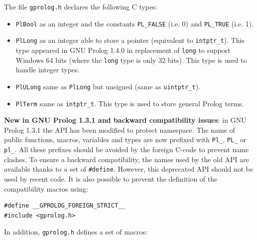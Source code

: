 
The file \texttt{gprolog.h} declares the following C types:

\begin{itemize}

\item \texttt{PlBool} as an integer and the constants \texttt{PL\_FALSE} (i.e. 0) and \texttt{PL\_TRUE}
(i.e. 1).

\item \texttt{PlLong} as an integer able to store a pointer (equivalent to
  \texttt{intptr\_t}). This type appeared in GNU Prolog 1.4.0 in replacement
  of \texttt{long} to support Windows 64 bits (where the \texttt{long} type is only
  32 bits). This type is used to handle integer types.

\item \texttt{PlULong} same as \texttt{PlLong} but unsigned (same as \texttt{uintptr\_t}).

\item \texttt{PlTerm} same as \texttt{intptr\_t}. This type is used to store general Prolog terms.

\end{itemize}


\textbf{New in GNU Prolog 1.3.1 and backward compatibility issues}: in
GNU Prolog 1.3.1 the API has been modified to protect namespace. The name of
public functions, macros, variables and types are now prefixed
with \texttt{Pl\_}, \texttt{PL\_} or \texttt{pl\_}. All these prefixes should
be avoided by the foreign C-code to prevent name clashes. To ensure a
backward compatibility, the names used by the old API are available thanks to
a set of \texttt{\#define}. However, this deprecated API should not be used
by recent code. It is also possible to prevent the definition of the
compatibility macros using:

\begin{Code}
\begin{verbatim}
#define __GPROLOG_FOREIGN_STRICT__
#include <gprolog.h>
\end{verbatim}
\end{Code}

In addition, \texttt{gprolog.h} defines a set of macros:

